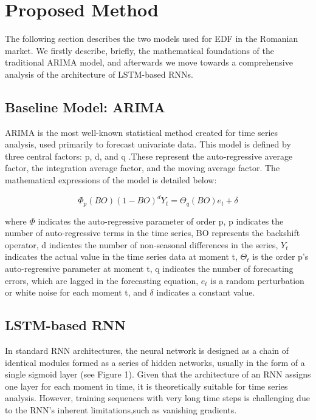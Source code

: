 \documentclass[10pt,twocolumn,letterpaper]{article}
\begin{document}
\section{Proposed Method}

The following section describes the two models used for EDF in the Romanian market. We firstly describe, briefly, the mathematical foundations of the traditional ARIMA model, and afterwards we move towards a comprehensive analysis of the architecture of LSTM-based RNNs.

\subsection{Baseline Model: ARIMA}

ARIMA is the most well-known statistical method created for time series analysis, used primarily  to forecast univariate data. This model is defined by three central factors: p, d, and q .These represent the auto-regressive average factor, the integration average factor, and the moving average factor. The mathematical expressions of the model is detailed below: 

$$\Phi_p(BO)(1-BO)^{d}Y_t=\Theta_q(BO)e_t+\delta$$

where $\Phi$ indicates the auto-regressive parameter of order p, p indicates the number of auto-regressive terms in the time series, BO represents the backshift operator, d indicates the number of non-seasonal differences in the series, $Y_t$ indicates the actual value in the  time series data at moment t, $\Theta_t$ is the order p’s auto-regressive parameter at moment t, q indicates the number of forecasting errors, which are lagged in the forecasting equation, $e_t$ is a random perturbation or white noise for each moment t, and $\delta$ indicates a constant value.



\subsection{LSTM-based RNN}

In standard RNN architectures, the neural network is designed as a chain of identical modules formed as a series of hidden networks, usually in the form of a single sigmoid layer (see Figure 1). Given that the architecture of an RNN assigns one layer for each moment in time, it is theoretically suitable for time series analysis. However, training  sequences with very long time steps is challenging due to the RNN’s inherent limitations,such as  vanishing gradients.
\end{document}
